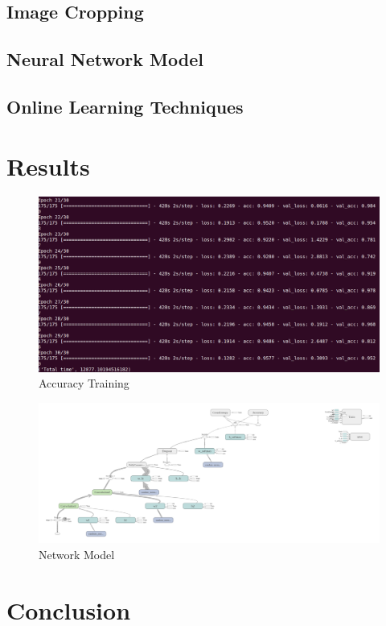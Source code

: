 \documentclass[journal]{IEEEtran}
\begin{document}
  \subsection{Image Cropping}
  
  \subsection{Neural Network Model}
  
  \subsection{Online Learning Techniques}
  
\section{Results} 
  \begin{figure}[H]
    \begin{center}
      \includegraphics[width=\linewidth]{pictures/results.png}
          \caption{Accuracy Training}
    \end{center}
  \end{figure}

\begin{figure}[H]
  \begin{center}
    \includegraphics[width=\linewidth]{pictures/model.png}
        \caption{Network Model}
  \end{center}
\end{figure}

\section{Conclusion}

\appendix
\newpage
%
%
\end{document}
